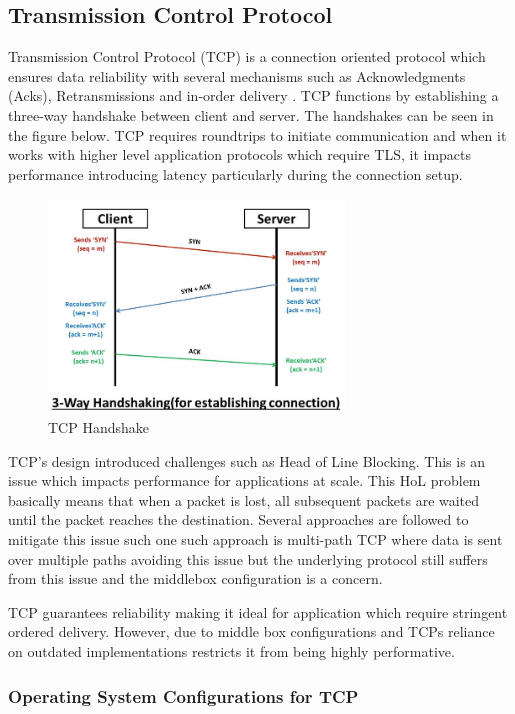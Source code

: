\subsection{Transmission Control Protocol}


Transmission Control Protocol (TCP) is a connection oriented protocol which ensures data reliability with several mechanisms such as Acknowledgments (Acks), Retransmissions and in-order delivery \cite{kurose2017}. TCP functions by establishing a three-way handshake between client and server. The handshakes can be seen in the figure below. TCP requires roundtrips to initiate communication and when it works with higher level application protocols which require TLS, it impacts performance introducing latency particularly during the connection setup.


\begin{figure}[H]
\caption{TCP Handshake}
\centering
\includegraphics[width=0.7\textwidth]{SOA/tcp.png}
\end{figure}


TCP's design introduced challenges such as Head of Line Blocking. This is an issue which impacts performance for applications at scale. This HoL problem basically means that when a packet is lost, all subsequent packets are waited until the packet reaches the destination. Several approaches are followed to mitigate this issue such one such approach is multi-path TCP where data is sent over multiple paths avoiding this issue but the underlying protocol still suffers from this issue and the middlebox configuration is a concern.

TCP guarantees reliability making it ideal for application which require stringent ordered delivery. However, due to middle box configurations and TCPs reliance on outdated implementations restricts it from being highly performative.


\subsubsection{Operating System Configurations for TCP}

